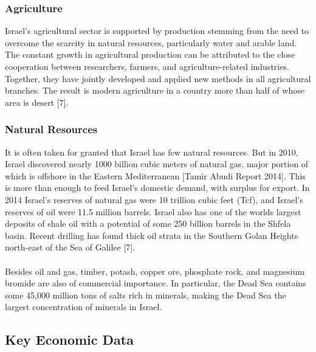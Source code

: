 \documentclass[10pt]{article}
\begin{document}
\subsubsection{Agriculture}
Israel’s agricultural sector is supported by production stemming from the need to overcome the scarcity in natural resources, particularly water and arable land. The constant growth in agricultural production can be attributed to the close cooperation between researchers, farmers, and agriculture-related industries. Together, they have jointly developed and applied new methods in all agricultural branches. The result is modern agriculture in a country more than half of whose area is desert [7].

\subsubsection{Natural Resources}
It is often taken for granted that Israel has few natural resources. But in 2010, Israel discovered nearly 1000 billion cubic meters of natural gas, major portion of which is offshore in the Eastern Mediterranean [Tamir Abudi Report 2014]. This is more than enough to feed Israel’s domestic demand, with surplus for export. In 2014 Israel’s reserves of natural gas were 10 trillion cubic feet (Tcf), and Israel’s reserves of oil were 11.5 million barrels. Israel also has one of the worlds largest deposits of shale oil with a potential of some 250 billion barrels in the Shfela basin. Recent drilling has found thick oil strata in the Southern Golan Heights north-east of the Sea of Galilee [7].
\\
\\
Besides oil and gas, timber, potash, copper ore, phosphate rock, and magnesium bromide are also of commercial importance. In particular, the Dead Sea contains some 45,000 million tons of salts rich in minerals, making the Dead Sea the largest concentration of minerals in Israel.

\subsection{Key Economic Data}
\end{document}
